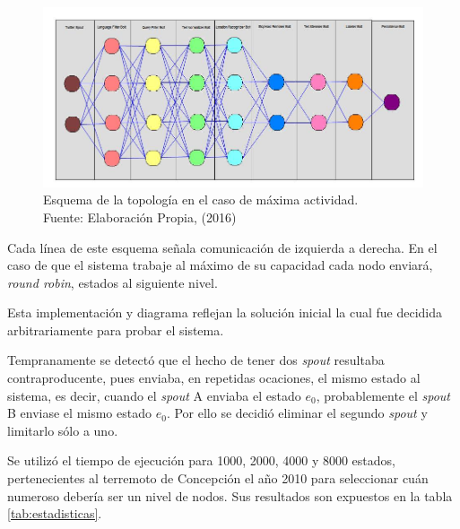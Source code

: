 \begin{figure}[H]
	\centering
	\captionsetup{justification=centering}
	\includegraphics[scale=0.5]{images/ImplementacionTopologia1.2.png}
	\caption[Esquema de la topología en el caso de máxima actividad.]{Esquema de la topología en el caso de máxima actividad.\\Fuente: Elaboración Propia, (2016)}
	\label{fig:Implementacion1p2}
\end{figure}

Cada línea de este esquema señala comunicación de izquierda a derecha. En el caso de que el sistema trabaje al máximo de su capacidad cada nodo enviará, \textit{round robin}, estados al siguiente nivel.

Esta implementación y diagrama reflejan la solución inicial la cual fue decidida arbitrariamente para probar el sistema.

Tempranamente se detectó que el hecho de tener dos \textit{spout} resultaba contraproducente, pues enviaba, en repetidas ocaciones, el mismo estado al sistema, es decir, cuando el \textit{spout} A enviaba el estado $e_{0}$, probablemente el \textit{spout} B enviase el mismo estado $e_{0}$. Por ello se decidió eliminar el segundo \textit{spout} y limitarlo sólo a uno.

Se utilizó el tiempo de ejecución para 1000, 2000, 4000 y 8000 estados, pertenecientes al terremoto de Concepción el año 2010 para seleccionar cuán numeroso debería ser un nivel de nodos. Sus resultados son expuestos en la tabla \ref{tab:estadisticas}.

